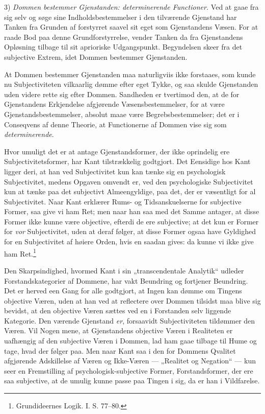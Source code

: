 \documentclass[12pt]{book}
\newcommand{\opage}[1]{\marginnote{\footnotesize\textit{[#1]}}}
\begin{document}
3) \emph{Dommen bestemmer Gjenstanden: determinerende
Functioner.} Ved at gaae fra sig selv og søge
sine Indholdsbestemmelser i den tilværende Gjenstand har
\opage{113}Tanken fra Grunden af forstyrret saavel sit eget som Gjenstandens
Væsen. For at raade Bod paa denne Grundforstyrrelse,
vender Tanken da fra Gjenstandens Opløsning tilbage
til sit aprioriske Udgangspunkt. Begyndelsen skeer fra
det subjective Extrem, idet Dommen bestemmer Gjenstanden.

At Dommen bestemmer Gjenstanden maa naturligviis
ikke forstaaes, som kunde nu Subjectiviteten vilkaarlig dømme
efter eget Tykke, og saa skulde Gjenstanden uden videre rette
sig efter Dommen. Sandheden er tvertimod den, at de for
Gjenstandens Erkjendelse afgjørende Væsensbestemmelser, for
at være Gjenstandsbestemmelser, absolut maae være Begrebsbestemmelser;
det er i Conseqvens af denne Theorie, at Functionerne
af Dommen vise sig som \emph{determinerende}.

Hvor umuligt det er at antage Gjenstandsformer, der ikke
oprindelig ere Subjectivitetsformer, har Kant tilstrækkelig godtgjort.
Det Eensidige hos Kant ligger deri, at han ved Subjectivitet
kun kan tænke sig en psychologisk Subjectivitet, medens
Opgaven omvendt er, ved den psychologiske Subjectivitet kun
at tænke paa det subjectivt Almeengyldige, paa det, der er
væsentligt for al Subjectivitet. Naar Kant erklærer Rums-
og Tidsanskuelserne for subjective Former, saa give vi ham
Ret; men naar han saa med det Samme antager, at disse
Former ikke kunne være objective, efterdi de ere subjective; at
det kun er Former for \emph{vor} Subjectivitet, uden at deraf følger,
at disse Former ogsaa have Gyldighed for en Subjectivitet
af høiere Orden, hvis en saadan gives: da kunne vi ikke give
ham Ret.\footnote{Grundideernes Logik. I. S. 77--80.} %

Den Skarpsindighed, hvormed Kant i sin „transcendentale
Analytik“ udleder Forstandskategorier af Dommene, har vakt
Beundring og fortjener Beundring. Det er herved een Gang
for alle godtgjort, at Ingen kan dømme om Tingens objective
Væren, uden at han ved at reflectere over Dommen tilsidst
\opage{114}maa blive sig bevidst, at den objective Væren sættes ved en i
Forstanden selv liggende Kategorie. Den værende Gjenstand
\emph{er}, forsaavidt Subjectiviteten tildømmer den Væren. Vil
Nogen mene, at Gjenstandens objective Væren i Realiteten er
uafhængig af den subjective Væren i Dommen, lad ham gaae
tilbage til Hume og tage, hvad der følger paa. Men naar
Kant saa i den for Dommens Qvalitet afgjørende Adskillelse
af Væren og Ikke-Væren --- „Realitet og Negation“ --- kun
seer en Fremstilling af psychologisk-subjective Former, Forstandsformer,
der ere saa subjective, at de umulig kunne passe
paa Tingen i sig, da er han i Vildfarelse.
\end{document}
